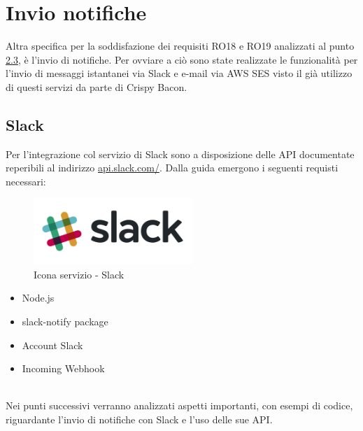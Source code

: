 \newpage
\section{Invio notifiche}
Altra specifica per la soddisfazione dei requisiti RO18 e RO19 analizzati al punto \hyperref[requisti-richiesti]{2.3}, è l'invio di notifiche. Per ovviare a ciò sono state realizzate le funzionalità per l'invio di messaggi istantanei via Slack e e-mail via AWS SES visto il già utilizzo di questi servizi da parte di Crispy Bacon.
\subsection{Slack}
Per l’integrazione col servizio di Slack sono a disposizione delle API documentate reperibili al indirizzo \href{https://api.slack.com/}{api.slack.com/}. Dalla guida emergono i seguenti requisti necessari:
\\
\begin{minipage}{0.5\textwidth}
	\begin{figure}[H]
		\includegraphics[width=6cm]{immagini/slack.png}
		\caption{\label{fig:icona_slack}Icona servizio - Slack}
	\end{figure}
\end{minipage}
\begin{minipage}{0.5\textwidth}
	\begin{itemize}
		\item Node.js
		\item slack-notify package
		\item Account Slack
		\item Incoming Webhook
	\end{itemize}
\end{minipage}
\\[0.4cm]
Nei punti successivi verranno analizzati aspetti importanti, con esempi di codice, riguardante l'invio di notifiche con Slack e l’uso delle sue API.

